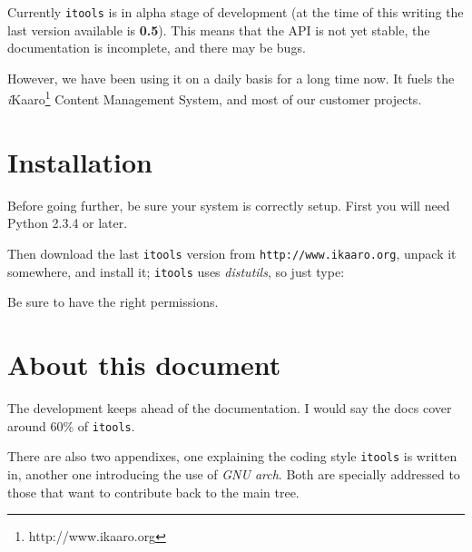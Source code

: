 Currently {\tt itools} is in alpha stage of development (at the time of
this writing the last version available is {\bf 0.5}). This means that the
API is not yet stable, the documentation is incomplete, and there may be bugs.

However, we have been using it on a daily basis for a long time now. It
fuels the {\em i}Kaaro\footnote{http://www.ikaaro.org} Content Management
System, and most of our customer projects.


\section{Installation}

Before going further, be sure your system is correctly setup. First you
will need Python 2.3.4 or later.

Then download the last {\tt itools} version from {\tt http://www.ikaaro.org},
unpack it somewhere, and install it; {\tt itools} uses {\em distutils}, so
just type:


Be sure to have the right permissions.


\section{About this document}

The development keeps ahead of the documentation. I would say the docs cover
around 60\% of {\tt itools}.

There are also two appendixes, one explaining the coding style {\tt itools}
is written in, another one introducing the use of {\em GNU arch}. Both are
specially addressed to those that want to contribute back to the main tree.
